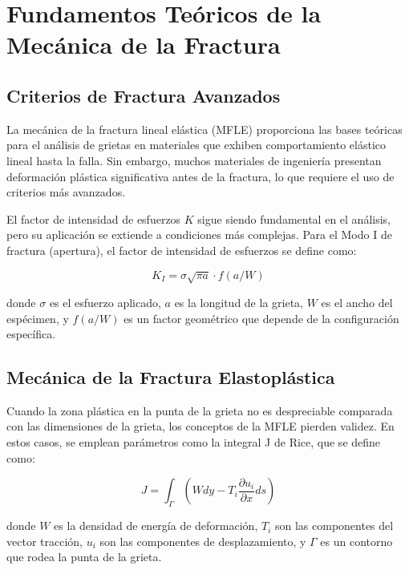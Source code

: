 \documentclass[12pt,letterpaper]{article}
\begin{document}
\section{Fundamentos Teóricos de la Mecánica de la Fractura}

\subsection{Criterios de Fractura Avanzados}

La mecánica de la fractura lineal elástica (MFLE) proporciona las bases teóricas para el análisis de grietas en materiales que exhiben comportamiento elástico lineal hasta la falla. Sin embargo, muchos materiales de ingeniería presentan deformación plástica significativa antes de la fractura, lo que requiere el uso de criterios más avanzados.

El factor de intensidad de esfuerzos $K$ sigue siendo fundamental en el análisis, pero su aplicación se extiende a condiciones más complejas. Para el Modo I de fractura (apertura), el factor de intensidad de esfuerzos se define como:

\begin{equation}
K_I = \sigma\sqrt{\pi a} \cdot f(a/W)
\end{equation}

donde $\sigma$ es el esfuerzo aplicado, $a$ es la longitud de la grieta, $W$ es el ancho del espécimen, y $f(a/W)$ es un factor geométrico que depende de la configuración específica.

\subsection{Mecánica de la Fractura Elastoplástica}

Cuando la zona plástica en la punta de la grieta no es despreciable comparada con las dimensiones de la grieta, los conceptos de la MFLE pierden validez. En estos casos, se emplean parámetros como la integral J de Rice, que se define como:

\begin{equation}
J = \int_{\Gamma} \left( W dy - T_i \frac{\partial u_i}{\partial x} ds \right)
\end{equation}

donde $W$ es la densidad de energía de deformación, $T_i$ son las componentes del vector tracción, $u_i$ son las componentes de desplazamiento, y $\Gamma$ es un contorno que rodea la punta de la grieta.
\end{document}
